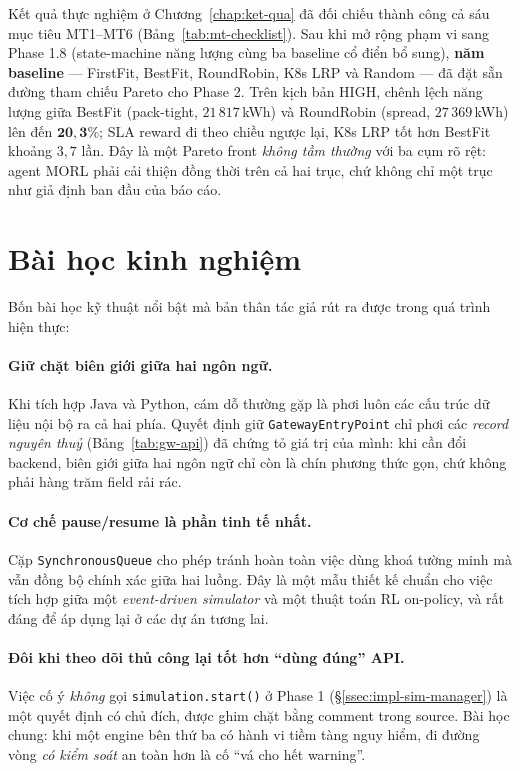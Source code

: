 Kết quả thực nghiệm ở Chương~\ref{chap:ket-qua} đã đối chiếu thành
công cả sáu mục tiêu MT1--MT6 (Bảng~\ref{tab:mt-checklist}). Sau
khi mở rộng phạm vi sang Phase 1.8 (state-machine năng lượng cùng
ba baseline cổ điển bổ sung), \textbf{năm baseline} --- FirstFit,
BestFit, RoundRobin, K8s LRP và Random --- đã đặt sẵn đường tham
chiếu Pareto cho Phase 2. Trên kịch bản HIGH, chênh lệch năng lượng
giữa BestFit (pack-tight, $21\,817$\,kWh) và RoundRobin (spread,
$27\,369$\,kWh) lên đến $\mathbf{20{,}3\%}$; SLA reward đi theo
chiều ngược lại, K8s LRP tốt hơn BestFit khoảng $3{,}7$ lần. Đây
là một Pareto front \emph{không tầm thường} với ba cụm rõ rệt:
agent MORL phải cải thiện đồng thời trên cả hai trục, chứ không
chỉ một trục như giả định ban đầu của báo cáo.

\section{Bài học kinh nghiệm}
\label{sec:bai-hoc}

Bốn bài học kỹ thuật nổi bật mà bản thân tác giả rút ra được trong
quá trình hiện thực:

\paragraph{Giữ chặt biên giới giữa hai ngôn ngữ.}
Khi tích hợp Java và Python, cám dỗ thường gặp là phơi luôn các cấu
trúc dữ liệu nội bộ ra cả hai phía. Quyết định giữ
\texttt{GatewayEntryPoint} chỉ phơi các \emph{record nguyên thuỷ}
(Bảng~\ref{tab:gw-api}) đã chứng tỏ giá trị của mình: khi cần đổi
backend, biên giới giữa hai ngôn ngữ chỉ còn là chín phương thức gọn,
chứ không phải hàng trăm field rải rác.

\paragraph{Cơ chế pause/resume là phần tinh tế nhất.}
Cặp \texttt{SynchronousQueue} cho phép tránh hoàn toàn việc dùng
khoá tường minh mà vẫn đồng bộ chính xác giữa hai luồng. Đây là một
mẫu thiết kế chuẩn cho việc tích hợp giữa một \emph{event-driven
simulator} và một thuật toán RL on-policy, và rất đáng để áp dụng
lại ở các dự án tương lai.

\paragraph{Đôi khi theo dõi thủ công lại tốt hơn ``dùng đúng'' API.}
Việc cố ý \emph{không} gọi \texttt{simulation.start()} ở Phase 1
(§\ref{ssec:impl-sim-manager}) là một quyết định có chủ đích, được
ghim chặt bằng comment trong source. Bài học chung: khi một engine bên thứ ba có hành
vi tiềm tàng nguy hiểm, đi đường vòng \emph{có kiểm soát} an toàn hơn
là cố ``vá cho hết warning''.

